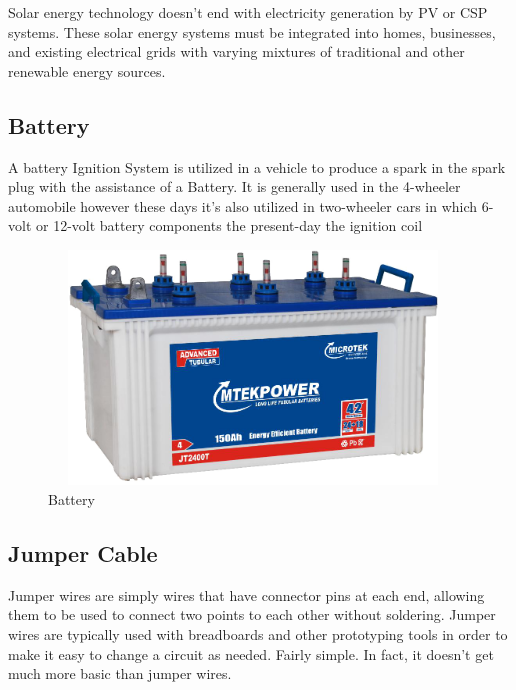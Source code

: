 	
	\vspace{1\baselineskip}
	Solar energy technology doesn’t end with electricity generation by PV or CSP systems. These solar energy systems must be integrated into homes, businesses, and existing electrical grids with varying mixtures of traditional and other renewable energy sources.
	


		\subsection{Battery} A battery Ignition System is utilized in a vehicle to produce a spark in the spark plug with the assistance of a Battery. It is generally used in the 4-wheeler automobile however these days it’s also utilized in two-wheeler cars in which 6-volt or 12-volt battery components the present-day the ignition coil


	
	\begin{figure}[H]
	\centering
	\includegraphics[width=10.86cm,height=6.23cm]{./images/image8.png}
        \caption{Battery}

	\end{figure}

	
          
	 \subsection{Jumper Cable} Jumper wires are simply wires that have connector pins at each end, allowing them to be used to connect two points to each other without soldering. Jumper wires are typically used with breadboards and other prototyping tools in order to make it easy to change a circuit as needed. Fairly simple. In fact, it doesn’t get much more basic than jumper wires.
	

